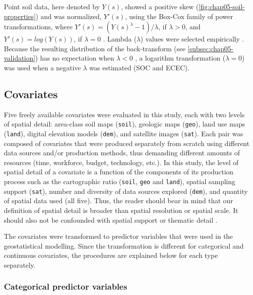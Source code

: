 Point soil data, here denoted by $Y(s)$, showed a positive skew (\autoref{fig:chap05-soil-properties}) and was 
normalized, $Y'(s)$, using the Box-Cox family of power transformations, where $Y'(s) = (Y(s)^{\lambda} - 1) / 
\lambda$, if $\lambda > 0$, and $Y'(s) = log(Y(s))$, if $\lambda = 0$ \cite{DiggleEtAl2007}. Lambda 
($\lambda$) values were selected empirically \cite{FoxEtAl2011}. Because the resulting distribution of the 
back-transform (see \autoref{subsec:chap05-validation}) has no expectation when $\lambda < 0$ 
\cite{RibeiroEtAl2001}, a logarithm transformation ($\lambda = 0$) was used when a negative $\lambda$ was 
estimated (SOC and ECEC).

\subsection{Covariates}
\label{subsec:chap05-sources}

Five freely available covariates were evaluated in this study, each with two levels of spatial detail: 
area-class soil maps (\texttt{soil}), geologic maps (\texttt{geo}), land use maps (\texttt{land}), digital 
elevation models (\texttt{dem}), and satellite images (\texttt{sat}). Each pair was composed of covariates 
that were produced separately from scratch using different data sources and/or production methods, thus 
demanding different amounts of resources (time, workforce, budget, technology, etc.). In this study, the level 
of spatial detail of a covariate is a function of the components of its production process such as the 
cartographic ratio (\texttt{soil}, \texttt{geo} and \texttt{land}), spatial sampling support (\texttt{sat}), 
number and diversity of data sources explored (\texttt{dem}), and quantity of spatial data used (all five). 
Thus, the reader should bear in mind that our definition of spatial detail is broader than spatial resolution 
or spatial scale. It should also not be confounded with spatial support \cite{WebsterEtAl2007} or thematic 
detail \cite{Rossiter2000}.

The covariates were transformed to predictor variables that were used in the geostatistical modelling. Since 
the transformation is different for categorical and continuous covariates, the procedures are explained below 
for each type separately.

\subsubsection*{Categorical predictor variables}
\label{subsubsec:chap05-categorical-covars}

